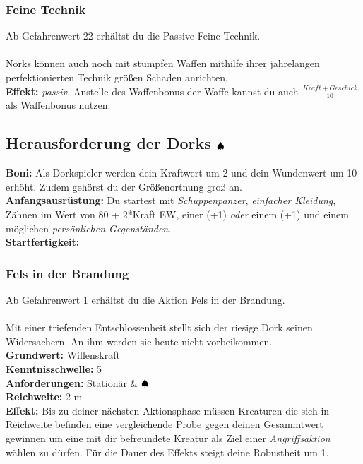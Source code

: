 \subsubsection*{ Feine Technik} \label{sk:feinetechnik}
Ab Gefahrenwert 22 erhältst du die Passive Feine Technik.\\
\\
Norks können auch noch mit stumpfen Waffen mithilfe ihrer jahrelangen perfektionierten Technik größen Schaden anrichten.\\
\textbf{Effekt:} \textit{passiv.} Anstelle des Waffenbonus der Waffe kannst du auch $\frac{Kraft+Geschick}{10}$ als Waffenbonus nutzen.\\


\subsection*{Herausforderung der Dorks ${\color{blue} }{\color{black}\spadesuit}$}
\textbf{Boni:} Als Dorkspieler werden dein Kraftwert um 2 und dein Wundenwert um 10 erhöht. Zudem gehörst du der Größenortnung groß an. \\
\textbf{Anfangsausrüstung:} Du startest mit \textit{Schuppenpanzer}, \textit{einfacher Kleidung}, Zähnen im Wert von 80 + 2*Kraft EW, einer  (+1) \textit{oder} einem  (+1) und einem möglichen \textit{persönlichen Gegenständen}. \\
\textbf{Startfertigkeit:} 

\subsubsection*{ Fels in der Brandung} \label{sk:fels_in_der_brandung}
Ab Gefahrenwert 1 erhältst du die Aktion Fels in der Brandung.\\
\\
Mit einer triefenden Entschlossenheit stellt sich der riesige Dork seinen Widersachern. An ihm werden sie heute nicht vorbeikommen. \\
\textbf{Grundwert:} Willenskraft \\
\textbf{Kenntnisschwelle:} 5 \\
\textbf{Anforderungen:} Stationär \& ${\color{blue} }{\color{black}\spadesuit}$ \\
\textbf{Reichweite:} 2 m \\
\textbf{Effekt:} Bis zu deiner nächsten Aktionsphase müssen Kreaturen die sich in Reichweite befinden eine vergleichende Probe gegen deinen Gesammtwert gewinnen um eine mit dir befreundete Kreatur als Ziel einer \textit{Angriffsaktion} wählen zu dürfen. Für die Dauer des Effekts steigt deine Robustheit um 1. 

